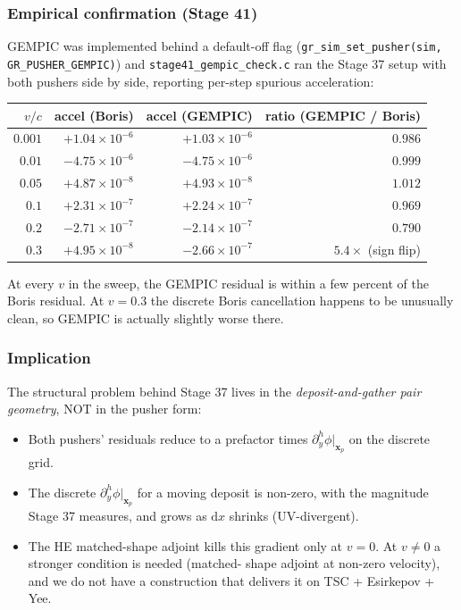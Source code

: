 \documentclass[11pt,a4paper]{article}
\newcommand{\vv}[1]{\mathbf{#1}}
\newcommand{\dd}{\mathrm{d}}
\begin{document}
\subsubsection*{Empirical confirmation (Stage 41)}

GEMPIC was implemented behind a default-off flag
(\texttt{gr\_sim\_set\_pusher(sim, GR\_PUSHER\_GEMPIC)}) and
\texttt{stage41\_gempic\_check.c} ran the Stage 37 setup with both
pushers side by side, reporting per-step spurious acceleration:

\begin{center}
\begin{tabular}{rrrr}
\toprule
$v/c$  & accel (Boris)    & accel (GEMPIC)    & ratio (GEMPIC / Boris) \\
\midrule
$0.001$ & $+1.04\times10^{-6}$ & $+1.03\times10^{-6}$ & $0.986$ \\
$0.01$  & $-4.75\times10^{-6}$ & $-4.75\times10^{-6}$ & $0.999$ \\
$0.05$  & $+4.87\times10^{-8}$ & $+4.93\times10^{-8}$ & $1.012$ \\
$0.1$   & $+2.31\times10^{-7}$ & $+2.24\times10^{-7}$ & $0.969$ \\
$0.2$   & $-2.71\times10^{-7}$ & $-2.14\times10^{-7}$ & $0.790$ \\
$0.3$   & $+4.95\times10^{-8}$ & $-2.66\times10^{-7}$ & $5.4\times$ (sign flip) \\
\bottomrule
\end{tabular}
\end{center}

At every $v$ in the sweep, the GEMPIC residual is within a few percent
of the Boris residual.  At $v = 0.3$ the discrete Boris cancellation
happens to be unusually clean, so GEMPIC is actually slightly worse
there.

\subsubsection*{Implication}

The structural problem behind Stage 37 lives in the
\emph{deposit-and-gather pair geometry}, NOT in the pusher form:

\begin{itemize}
  \item Both pushers' residuals reduce to a prefactor times
    $\partial^h_y\phi|_{\vv x_p}$ on the discrete grid.
  \item The discrete $\partial^h_y\phi|_{\vv x_p}$ for a moving
    deposit is non-zero, with the magnitude Stage 37 measures, and
    grows as $\dd x$ shrinks (UV-divergent).
  \item The HE matched-shape adjoint kills this gradient only at
    $v = 0$.  At $v \ne 0$ a stronger condition is needed (matched-
    shape adjoint at non-zero velocity), and we do not have a
    construction that delivers it on TSC + Esirkepov + Yee.
\end{itemize}
\end{document}
